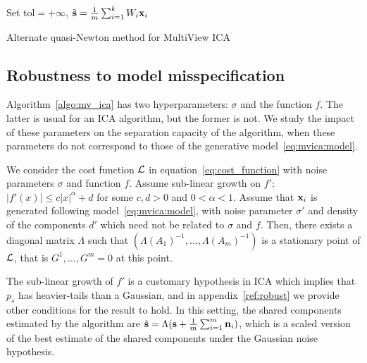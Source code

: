 \documentclass{report}
\begin{document}
\begin{algorithm}
\SetAlgoLined
{}
Set tol$=+\infty$, $\tilde{\mathbf{s}} = \frac1m\sum_{i=1}^kW_i\mathbf{x}_i$\\
 \caption{Alternate quasi-Newton method for MultiView ICA}
 \label{algo:mv_ica}
\end{algorithm}
%
%
%
%
\subsection{Robustness to model misspecification}
Algorithm~\ref{algo:mv_ica} has two hyperparameters: $\sigma$ and the function $f$.
%
The latter is usual for an ICA algorithm, but the former is not.
%
We study the impact of these parameters on the separation capacity of the algorithm, when these parameters do not correspond to those of the generative model~\eqref{eq:mvica:model}.
%
\begin{proposition}
\label{prop:robust}
We consider the cost function $\mathcal{L}$ in equation~\eqref{eq:cost_function} with noise parameters $\sigma$ and function $f$.
%
Assume sub-linear growth on $f'$: $|f'(x)|\leq c|x|^{\alpha} + d$ for some $c, d > 0$ and $0<\alpha<1$.
%
Assume that $\mathbf{x}_i$ is generated following model~\eqref{eq:mvica:model}, with noise parameter $\sigma'$ and density of the components $d'$ which need not be related to $\sigma$ and $f$.
%
Then, there exists a diagonal matrix $\Lambda$ such that $(\Lambda (A_1)^{-1}, \dots, \Lambda (A_m)^{-1})$ is a stationary point of $\mathcal{L}$, that is $G^1,\dots, G^m =0$ at this point.
\end{proposition}
%
The sub-linear growth of $f'$ is a customary hypothesis in ICA which implies that $p_s$ has heavier-tails than a Gaussian, and in appendix~\ref{ref:robust} we provide other conditions for the result to hold.
%
In this setting, the shared components estimated by the algorithm are $\tilde{\mathbf{s}} = \Lambda (\mathbf{s} + \frac1m \sum_{i=1}^m \mathbf{n}_i)$, which is a scaled version of the best estimate of the shared components under the Gaussian noise hypothesis.
\end{document}
